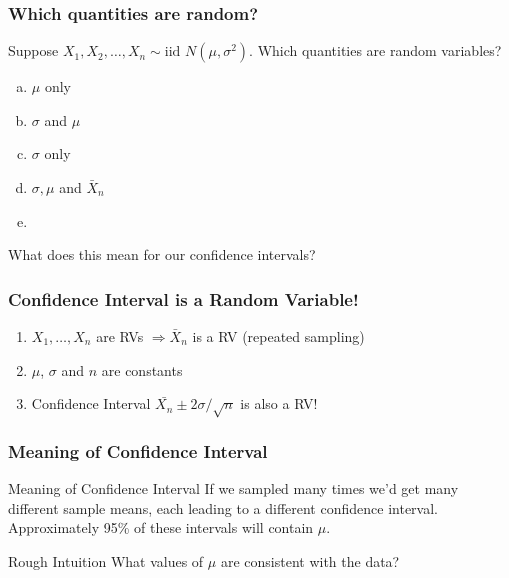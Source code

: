 \documentclass{beamer}
\begin{document}
\begin{frame}
\frametitle{Which quantities are random?}
Suppose $X_1, X_2, \hdots, X_n\sim \mbox{iid } N(\mu,\sigma^2)$.
Which quantities are random variables?
	\begin{enumerate}[(a)]
\item $\mu$ only
\item $\sigma$ and $\mu$
\item $\sigma$ only
\item $\sigma, \mu$ and $\bar{X}_n$
\item {}
\end{enumerate}

\vspace{1em}
\pause
\alert{What does this mean for our confidence intervals?}

\end{frame}

\begin{frame}
\frametitle{Confidence Interval is a Random Variable!}
\begin{enumerate}
	\item $X_1, \hdots, X_n$ are RVs $\Rightarrow \bar{X}_n$ is a RV (repeated sampling) \pause
	\item $\mu$, $\sigma$ and $n$ are constants \pause
	\item Confidence Interval $\bar{X_n}\pm 2 \sigma/\sqrt{n}$ is also a RV!
\end{enumerate}

\end{frame}

\begin{frame}
\frametitle{Meaning of Confidence Interval}
\begin{block}{Meaning of Confidence Interval}
If we sampled many times we'd get many different sample means, each leading to a \alert{different} confidence interval. Approximately 95\% of these intervals will contain $\mu$.
\end{block}
 

\begin{block}{Rough Intuition}
What values of $\mu$ are consistent with the data?
\end{block}

\end{frame}
\end{document}
